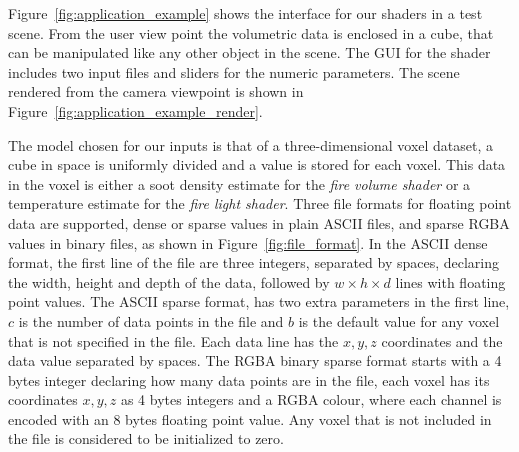 Figure~\ref{fig:application_example} shows the \Maya interface for our shaders in a test scene.
From the user view point the volumetric data is enclosed in a cube, that can be manipulated like any other object in the scene.
The GUI for the shader includes two input files and  sliders for the numeric parameters. 
The scene rendered from the camera viewpoint is shown in Figure~\ref{fig:application_example_render}.

The model chosen for our inputs is that of a three-dimensional voxel dataset, a cube in space is uniformly divided and a value is stored for each voxel.
This data in the voxel is either a soot density estimate for the \textit{fire volume shader} or a temperature estimate for the \textit{fire light shader}.
Three file formats for floating point data are supported, dense or sparse values in plain ASCII files, and sparse RGBA values in binary files, as shown in Figure~\ref{fig:file_format}.
In the ASCII dense format, the first line of the file are three integers, separated by spaces, declaring the width, height and depth of the data, followed by $w \times h \times d$ lines with floating point values.
The ASCII sparse format, has two extra parameters in the first line, $c$ is the number of data points in the file and $b$ is the default value for any voxel that is not specified in the file.
Each data line has the $x,y,z$ coordinates and the data value separated by spaces.
The RGBA binary sparse format starts with a 4 bytes integer declaring how many data points are in the file, each voxel has its coordinates $x,y,z$ as 4 bytes integers and a RGBA colour, where each channel is encoded with an 8 bytes floating point value.
Any voxel that is not included in the file is considered to be initialized to zero. 

